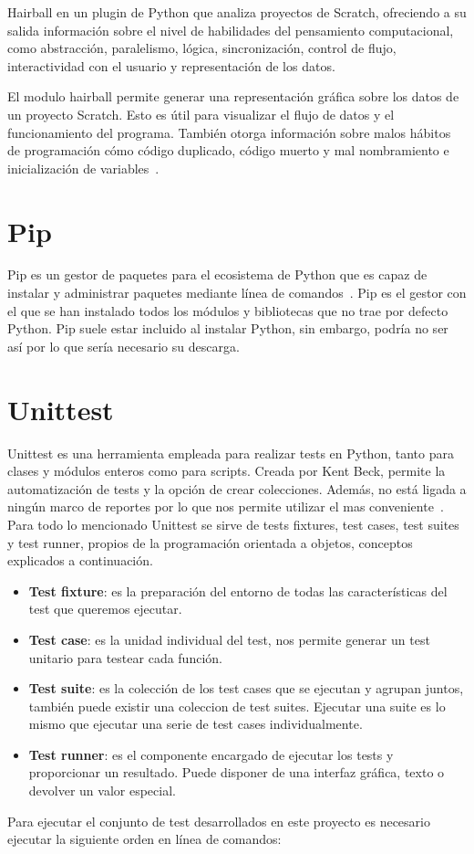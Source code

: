 \documentclass[a4paper, 12pt]{book}
\begin{document}
Hairball en un plugin de Python que analiza proyectos de Scratch, ofreciendo a su salida información sobre el nivel de habilidades del pensamiento computacional, como abstracción, paralelismo, lógica, sincronización, control de flujo, interactividad con el usuario y representación de los datos.

El modulo hairball permite generar una representación gráfica sobre los datos de un proyecto Scratch. Esto es útil para visualizar el flujo de datos y el funcionamiento del programa. También otorga información sobre malos hábitos de programación cómo código duplicado, código muerto y mal nombramiento e inicialización de variables~\cite{boe2013hairball}.

\section{Pip} 
\label{sec:pip}

Pip es un gestor de paquetes para el ecosistema de Python que es capaz de instalar y administrar paquetes mediante línea de comandos~\cite{pipWeb}. Pip es el gestor con el que se han instalado todos los módulos y bibliotecas que no trae por defecto Python. Pip suele estar incluido al instalar Python, sin embargo, podría no ser así por lo que sería necesario su descarga.

\section{Unittest} 
\label{sec:unittest}

Unittest es una herramienta empleada para realizar tests en Python, tanto para clases y módulos enteros como para scripts. Creada por Kent Beck, permite la automatización de tests y la opción de crear colecciones. Además, no está ligada a ningún marco de reportes por lo que nos permite utilizar el mas conveniente~\cite{unittestWeb}. Para todo lo mencionado Unittest se sirve de tests fixtures, test cases, test suites y test runner, propios de la programación orientada a objetos, conceptos explicados a continuación. 

\begin{itemize}
	\item \textbf{Test fixture}: es la preparación del entorno de todas las características del test que queremos ejecutar.
	\item \textbf{Test case}: es la unidad individual del test, nos permite generar un test unitario para testear cada función.
	\item \textbf{Test suite}: es la colección de los test cases que se ejecutan y agrupan juntos, también puede existir una coleccion de test suites. Ejecutar una suite es lo mismo que ejecutar una serie de test cases individualmente.
	\item \textbf{Test runner}: es el componente encargado de ejecutar los tests y proporcionar un resultado. Puede disponer de una interfaz gráfica, texto o devolver un valor especial.
\end{itemize}
\newpage 
Para ejecutar el conjunto de test desarrollados en este proyecto es necesario ejecutar la siguiente orden en línea de comandos:
\end{document}
